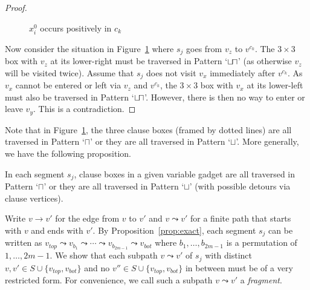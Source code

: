 \documentclass[envcountsame]{llncs}
\newcommand*{\sqcupsqcap}{{\sqcup}{\mkern-3mu \sqcap}}
\begin{document}
\begin{proof}
\begin{figure}[h]
\caption{$x_i^0$ occurs positively in $c_k$}
\label{fig:cannotjump}
\end{figure}

Now consider the situation in Figure~\ref{fig:cannotjump} where $s_j$ goes from
$v_z$ to $v^{c_k}$. The $3 \times 3$ box with $v_z$ at its lower-right
must be traversed in Pattern `$\sqcupsqcap$' (as otherwise $v_z$ will be visited twice).
Assume that $s_j$ does not visit $v_x$ immediately after $v^{c_k}$.
As $v_x$ cannot be entered or left via $v_z$ and $v^{c_k}$, the $3 \times 3$ box with $v_x$ at its lower-left
must also be traversed in Pattern `$\sqcupsqcap$'. However, there is then no way to enter or leave $v_y$.
This is a contradiction.
\end{proof}
Note that in Figure~\ref{fig:cannotjump}, the three clause boxes (framed by dotted lines) are all traversed
in Pattern `$\sqcap$' or they are all traversed in Pattern `$\sqcup$'. More generally, we
have the following proposition. 
\begin{proposition}\label{col:asawhole}
In each segment $s_j$, clause boxes in a given variable gadget
are all traversed in Pattern `$\sqcap$' or they are all traversed in Pattern `$\sqcup$' (with possible detours via clause vertices).
\end{proposition}


Write $v \rightarrow v'$ for the edge from $v$ to $v'$ and
$v \leadsto v'$ for a finite path that starts with $v$ and ends with $v'$.
By Proposition~\ref{prop:exact}, each segment $s_j$ can be written as $v_{top} \leadsto v_{b_1} \leadsto \cdots \leadsto v_{b_{2m - 1}} \leadsto v_{bot}$
where $b_1, \ldots, b_{2m - 1}$ is a permutation of $1, \ldots, 2m - 1$.
We show that each subpath $v \leadsto v'$ of $s_j$ with distinct $v, v' \in S \cup \{v_{top}, v_{bot}\}$
and no $v'' \in S \cup \{ v_{top}, v_{bot} \}$ in between
must be of a very restricted form. For convenience, we call such a subpath $v \leadsto v'$ a \emph{fragment}.
\end{document}
